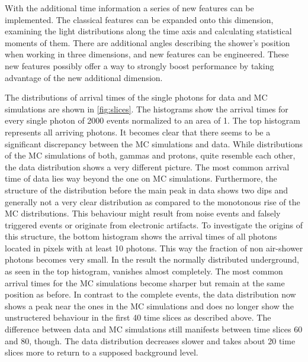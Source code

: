 With the additional time information a series of new features can be
implemented. The classical features can be expanded onto this dimension,
examining the light distributions along the time axis and calculating
statistical moments of them. There are additional angles describing the
shower's position when working in three dimensions, and new features can be
engineered. These new features possibly offer a way to strongly boost
performance by taking advantage of the new additional dimension.

The distributions of arrival times of the single photons for data and MC
simulations are shown in \autoref{fig:slices}. The histograms show the arrival
times for every single photon of 2000 events normalized to an area of 1. The
top histogram represents all arriving photons. It becomes clear that there
seems to be a significant discrepancy between the MC simulations and data.
While distributions of the MC simulations of both, gammas and protons, quite
resemble each other, the data distribution shows a very different picture. The
most common arrival time of data lies way beyond the one on MC simulations.
Furthermore, the structure of the distribution before the main peak in data
shows two dips and generally not a very clear distribution as compared to the
monotonous rise of the MC distributions. This behaviour might result from noise
events and falsely triggered events or originate from electronic artifacts. To
investigate the origins of this structure, the bottom histogram shows the
arrival times of all photons located in pixels with at least \num{10} photons.
This way the fraction of non air-shower photons becomes very small. In the
result the normally distributed underground, as seen in the top histogram,
vanishes almost completely. The most common arrival times for the MC
simulations become sharper but remain at the same position as before. In
contrast to the complete events, the data distribution now shows a peak near
the ones in the MC simulations and does no longer show the unstructered
behaviour in the first \num{40} time slices as described above. The difference
between data and MC simulations still manifests between time slices \num{60}
and \num{80}, though. The data distribution decreases slower and takes about
\num{20} time slices more to return to a supposed background level.
%
